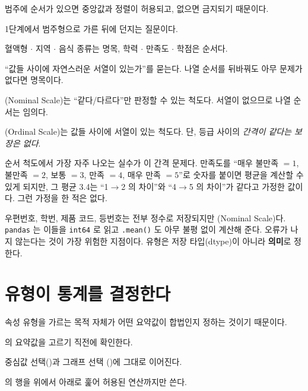 \begin{inbrief}
  \item[Why] 범주에 순서가 있으면 중앙값과 정렬이 허용되고, 없으면 금지되기
             때문이다.
  \item[When] 1단계에서 범주형으로 가른 뒤에 던지는 질문이다.
  \item[Where] 혈액형 $\cdot$ 지역 $\cdot$ 음식 종류는 명목, 학력 $\cdot$ 만족도
               $\cdot$ 학점은 순서다.
  \item[How] ``값들 사이에 자연스러운 서열이 있는가''를 묻는다. 나열 순서를
             뒤바꿔도 아무 문제가 없다면 명목이다.
\end{inbrief}

\begin{definition}[명목 척도와 순서 척도]
\label{def:nominal-ordinal}
(Nominal Scale)는 ``같다/다르다''만 판정할 수 있는 척도다.
서열이 없으므로 나열 순서는 임의다.

(Ordinal Scale)는 값들 사이에 서열이 있는 척도다. 단, 등급
사이의 \emph{간격이 같다는 보장은 없다}.
\end{definition}

순서 척도에서 가장 자주 나오는 실수가 이 간격 문제다. 만족도를
``매우 불만족 $=1$, 불만족 $=2$, 보통 $=3$, 만족 $=4$, 매우 만족 $=5$''로
숫자를 붙이면 평균을 계산할 수 있게 되지만, 그 평균 3.4는
``1$\to$2 의 차이''와 ``4$\to$5 의 차이''가 같다고 가정한 값이다. 그런 가정을
한 적은 없다.

\begin{pitfall}
우편번호, 학번, 제품 코드, 등번호는 전부 정수로 저장되지만 (Nominal Scale)다. \texttt{pandas} 는 이들을 \texttt{int64} 로 읽고
\texttt{.mean()} 도 아무 불평 없이 계산해 준다. 오류가 나지 않는다는 것이
가장 위험한 지점이다. 유형은 저장 타입(dtype)이 아니라 \textbf{의미}로
정한다.
\end{pitfall}

\section{유형이 통계를 결정한다}
\label{sec:attr-stats}

\begin{inbrief}
  \item[Why] 속성 유형을 가르는 목적 자체가 어떤 요약값이 합법인지 정하는
             것이기 때문이다.
  \item[When] 의 요약값을 고르기 직전에 확인한다.
  \item[Where] 중심값 선택()과 그래프 선택
               ()에 그대로 이어진다.
  \item[How]  의 행을 위에서 아래로 훑어 허용된 연산까지만
             쓴다.
\end{inbrief}

